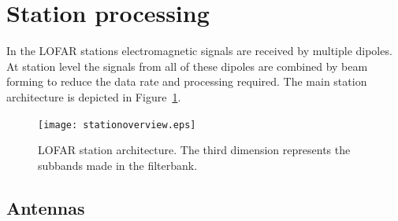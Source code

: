 \documentclass[journal]{IEEEtran}
\begin{document}
%



\section{Station processing}

In the LOFAR stations electromagnetic signals are received by multiple dipoles. At station level the signals from all of these dipoles are combined by beam forming to reduce the data rate and processing required. The main station architecture is depicted in Figure~\ref{fig:stationarch}. 

\begin{figure}
\begin{center}
\texttt{[image: stationoverview.eps]}
\end{center}
\caption{LOFAR station architecture. The third dimension represents the subbands made in the filterbank.}
\label{fig:stationarch}
\end{figure}

\subsection{Antennas}
\end{document}
